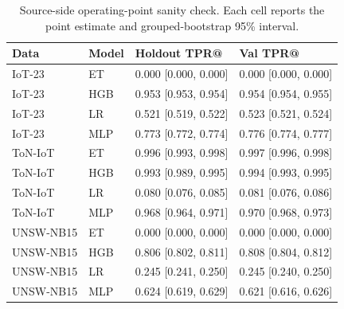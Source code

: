 \begin{table}[htbp]
\centering
\scriptsize
\setlength{\tabcolsep}{4pt}
\caption{Source-side operating-point sanity check. Each cell reports the point estimate and grouped-bootstrap 95\% interval.}
\label{tab:acsac-within-domain}
\begin{tabular}{llp{2.2cm}p{2.2cm}}
\toprule
Data & Model & Holdout TPR@\FrozenFprTarget{} & Val TPR@\FrozenFprTarget{} \\
\midrule
IoT-23 & ET & 0.000 [0.000, 0.000] & 0.000 [0.000, 0.000] \\
IoT-23 & HGB & 0.953 [0.953, 0.954] & 0.954 [0.954, 0.955] \\
IoT-23 & LR & 0.521 [0.519, 0.522] & 0.523 [0.521, 0.524] \\
IoT-23 & MLP & 0.773 [0.772, 0.774] & 0.776 [0.774, 0.777] \\
ToN-IoT & ET & 0.996 [0.993, 0.998] & 0.997 [0.996, 0.998] \\
ToN-IoT & HGB & 0.993 [0.989, 0.995] & 0.994 [0.993, 0.995] \\
ToN-IoT & LR & 0.080 [0.076, 0.085] & 0.081 [0.076, 0.086] \\
ToN-IoT & MLP & 0.968 [0.964, 0.971] & 0.970 [0.968, 0.973] \\
UNSW-NB15 & ET & 0.000 [0.000, 0.000] & 0.000 [0.000, 0.000] \\
UNSW-NB15 & HGB & 0.806 [0.802, 0.811] & 0.808 [0.804, 0.812] \\
UNSW-NB15 & LR & 0.245 [0.241, 0.250] & 0.245 [0.240, 0.250] \\
UNSW-NB15 & MLP & 0.624 [0.619, 0.629] & 0.621 [0.616, 0.626] \\
\bottomrule
\end{tabular}
\end{table}
